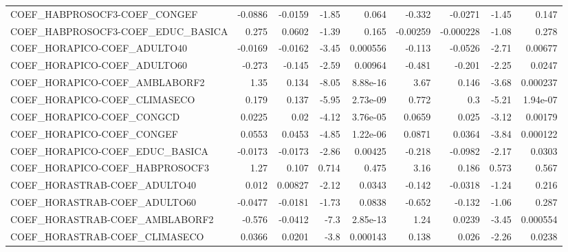 \begin{tabular}{lrrrrrrrr}
COEF\_HABPROSOCF3-COEF\_CONGEF           &     -0.0886 &      -0.0159 &   -1.85 &    0.064 &     -0.332 &     -0.0271 &        -1.45 &         0.147 \\
COEF\_HABPROSOCF3-COEF\_EDUC\_BASICA      &       0.275 &       0.0602 &   -1.39 &    0.165 &   -0.00259 &   -0.000228 &        -1.08 &         0.278 \\
COEF\_HORAPICO-COEF\_ADULTO40            &     -0.0169 &      -0.0162 &   -3.45 & 0.000556 &     -0.113 &     -0.0526 &        -2.71 &       0.00677 \\
COEF\_HORAPICO-COEF\_ADULTO60            &      -0.273 &       -0.145 &   -2.59 &  0.00964 &     -0.481 &      -0.201 &        -2.25 &        0.0247 \\
COEF\_HORAPICO-COEF\_AMBLABORF2          &        1.35 &        0.134 &   -8.05 & 8.88e-16 &       3.67 &       0.146 &        -3.68 &      0.000237 \\
COEF\_HORAPICO-COEF\_CLIMASECO           &       0.179 &        0.137 &   -5.95 & 2.73e-09 &      0.772 &         0.3 &        -5.21 &      1.94e-07 \\
COEF\_HORAPICO-COEF\_CONGCD              &      0.0225 &         0.02 &   -4.12 & 3.76e-05 &     0.0659 &       0.025 &        -3.12 &       0.00179 \\
COEF\_HORAPICO-COEF\_CONGEF              &      0.0553 &       0.0453 &   -4.85 & 1.22e-06 &     0.0871 &      0.0364 &        -3.84 &      0.000122 \\
COEF\_HORAPICO-COEF\_EDUC\_BASICA         &     -0.0173 &      -0.0173 &   -2.86 &  0.00425 &     -0.218 &     -0.0982 &        -2.17 &        0.0303 \\
COEF\_HORAPICO-COEF\_HABPROSOCF3         &        1.27 &        0.107 &   0.714 &    0.475 &       3.16 &       0.186 &        0.573 &         0.567 \\
COEF\_HORASTRAB-COEF\_ADULTO40           &       0.012 &      0.00827 &   -2.12 &   0.0343 &     -0.142 &     -0.0318 &        -1.24 &         0.216 \\
COEF\_HORASTRAB-COEF\_ADULTO60           &     -0.0477 &      -0.0181 &   -1.73 &   0.0838 &     -0.652 &      -0.132 &        -1.06 &         0.287 \\
COEF\_HORASTRAB-COEF\_AMBLABORF2         &      -0.576 &      -0.0412 &    -7.3 & 2.85e-13 &       1.24 &      0.0239 &        -3.45 &      0.000554 \\
COEF\_HORASTRAB-COEF\_CLIMASECO          &      0.0366 &       0.0201 &    -3.8 & 0.000143 &      0.138 &       0.026 &        -2.26 &        0.0238 \\

\end{tabular}
